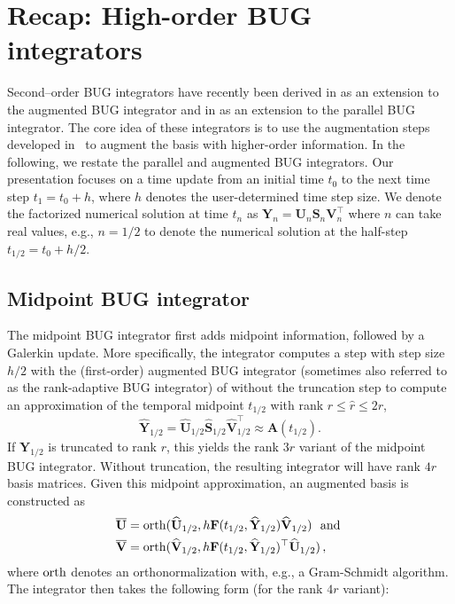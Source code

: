 \documentclass[preprint,runningheads]{svjour3}
\def\wh{\widehat}
\def\wt{\widetilde}
\def\wt{\overline}
\def\h{{1/2}}
\newcommand\bfA{{\mathbf A}}
\newcommand\bfF{{\mathbf F}}
\newcommand\bfS{{\mathbf S}}
\newcommand\bfU{{\mathbf U}}
\newcommand\bfV{{\mathbf V}}
\newcommand\bfY{{\mathbf Y}}
\begin{document}
\section{Recap: High-order BUG integrators}\label{app:recap}

Second--order BUG integrators have recently been derived in \cite{ceruti2024robust} {as an extension to the augmented BUG integrator and in \cite{kusch2024second} as an extension to the parallel BUG integrator}. The core idea of these integrators is to use the augmentation steps developed in~\cite{CeKL22} to augment the basis with higher-order information. In the following, we restate the parallel and augmented BUG integrators. Our presentation focuses on a time update from an initial time $t_0$ to the next time step $t_1 = t_0 + h$, where $h$ denotes the user-determined time step size. We denote the factorized numerical solution at time $t_n$ as $\bfY_n = \bfU_n\bfS_n\bfV_n^{\top}$ where $n$ can take real values, e.g., $n=1/2$ to denote the numerical solution at the half-step $t_{1/2} = t_0 + h/2$.


\subsection{Midpoint BUG integrator}
The midpoint BUG integrator \cite{ceruti2024robust} first adds midpoint information, followed by a Galerkin update. More specifically, the integrator computes a step with step size $h/2$ with the (first-order) augmented BUG integrator (sometimes also referred to as the rank-adaptive BUG integrator) of \cite{ceruti2024robust} without the truncation step to compute an approximation of the temporal midpoint $t_{1/2}$ with rank $r \le\wh r \le 2r$,
$$
\wh \bfY_{1/2}=\wh\bfU_\h \wh\bfS_\h \wh\bfV_\h^\top \approx \bfA(t_\h).
$$ 
If $\bfY_{1/2}$ is truncated to rank $r$, this yields the rank $3r$ variant of the midpoint BUG integrator. Without truncation, the resulting integrator will have rank $4r$ basis matrices. Given this midpoint approximation, an augmented basis is constructed as
\begin{equation}\label{eq:Ubar-Vbar}
\begin{aligned}
\wt \bfU &= {\rm orth}(\wh\bfU_\h, h\bfF(t_\h,\wh \bfY_\h) \wh\bfV_\h) \ \hbox{ and }\\
\wt \bfV &= {\rm orth}(\wh\bfV_\h, h\bfF(t_\h,\wh\bfY_\h)^\top  \wh\bfU_\h)\,,
\end{aligned}
\end{equation}
where ${\rm orth}$ denotes an orthonormalization with, e.g., a Gram-Schmidt algorithm. The integrator then takes the following form (for the rank $4r$ variant):
\end{document}
